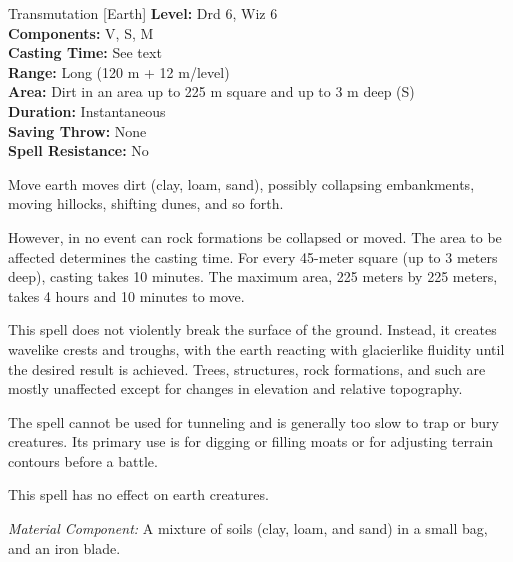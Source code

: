 {Transmutation [Earth]}
{
	\textbf{Level:}
	Drd 6, Wiz 6\\
	\textbf{Components:}
	V, S, M\\
	\textbf{Casting Time:}
	See text\\
	\textbf{Range:}
	Long (120 m + 12 m/level)\\
	\textbf{Area:}
	Dirt in an area up to 225 m square and up to 3 m deep (S)\\
	\textbf{Duration:}
	Instantaneous\\
	\textbf{Saving Throw:}
	None\\
	\textbf{Spell Resistance:}
	No\\
}
{
	Move earth moves dirt (clay, loam, sand), possibly collapsing embankments, moving hillocks, shifting dunes, and so forth.

	However, in no event can rock formations be collapsed or moved. The area to be affected determines the casting time. For every 45-meter square (up to 3 meters deep), casting takes 10 minutes. The maximum area, 225 meters by 225 meters, takes 4 hours and 10 minutes to move.

	This spell does not violently break the surface of the ground. Instead, it creates wavelike crests and troughs, with the earth reacting with glacierlike fluidity until the desired result is achieved. Trees, structures, rock formations, and such are mostly unaffected except for changes in elevation and relative topography.

	The spell cannot be used for tunneling and is generally too slow to trap or bury creatures. Its primary use is for digging or filling moats or for adjusting terrain contours before a battle.

	This spell has no effect on earth creatures.

	\textit{Material Component:}
	A mixture of soils (clay, loam, and sand) in a small bag, and an iron blade.

}
